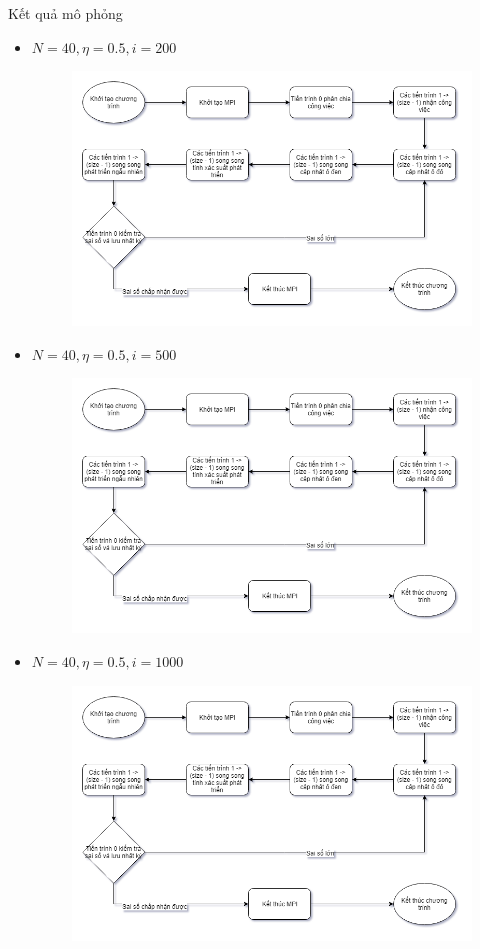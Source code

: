 \begin{frame}[allowframebreaks]{Kết quả mô phỏng}
\begin{itemize}
\begin{figure}[H]
    \end{figure}
\end{itemize}
\break
\begin{itemize}
    \item $N = 40, \eta = 0.5, i = 200$
    \begin{figure}[H]
        \centering
        \includegraphics[width=110mm]{img/algo-flowchart.png}
    \end{figure}
\end{itemize}
\break
\begin{itemize}
    \item $N = 40, \eta = 0.5, i = 500$
    \begin{figure}[H]
        \centering
        \includegraphics[width=110mm]{img/algo-flowchart.png}
    \end{figure}
\end{itemize}
\break
\begin{itemize}
    \item $N = 40, \eta = 0.5, i = 1000$
    \begin{figure}[H]
        \centering
        \includegraphics[width=110mm]{img/algo-flowchart.png}

\end{figure}
\end{itemize}
\end{frame}
